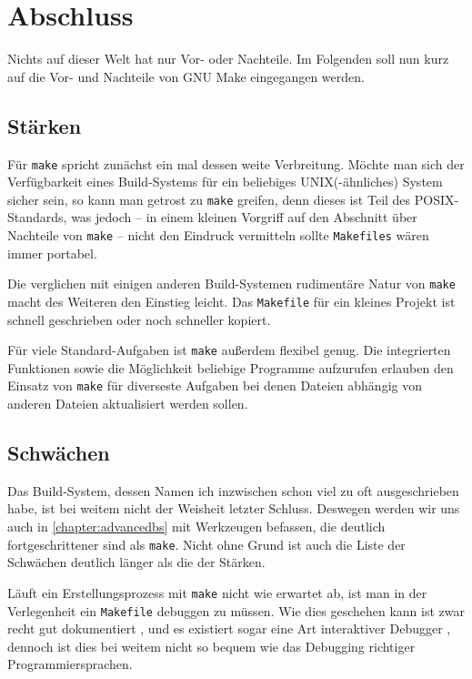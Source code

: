\section{Abschluss}

Nichts auf dieser Welt hat nur Vor- oder Nachteile. Im Folgenden soll nun kurz
auf die Vor- und Nachteile von GNU Make eingegangen werden.

\subsection{Stärken}

Für \texttt{make} spricht zunächst ein mal dessen weite Verbreitung. Möchte man
sich der Verfügbarkeit eines Build-Systems für ein beliebiges UNIX(-ähnliches)
System sicher sein, so kann man getrost zu \texttt{make} greifen, denn dieses
ist Teil des POSIX-Standards, was jedoch -- in einem kleinen Vorgriff auf den
Abschnitt über Nachteile von \texttt{make} -- nicht den Eindruck vermitteln
sollte \texttt{Makefiles} wären immer portabel.

Die verglichen mit einigen anderen Build-Systemen rudimentäre Natur von
\texttt{make} macht des Weiteren den Einstieg leicht. Das \texttt{Makefile} für
ein kleines Projekt ist schnell geschrieben oder noch schneller kopiert.

Für viele Standard-Aufgaben ist \texttt{make} außerdem flexibel genug. Die
integrierten Funktionen sowie die Möglichkeit beliebige Programme aufzurufen
erlauben den Einsatz von \texttt{make} für diverseste Aufgaben bei denen Dateien
abhängig von anderen Dateien aktualisiert werden sollen.

\subsection{Schwächen} 

Das Build-System, dessen Namen ich inzwischen schon viel zu oft ausgeschrieben
habe, ist bei weitem nicht der Weisheit letzter Schluss. Deswegen werden wir
uns auch in \autoref{chapter:advancedbs} mit Werkzeugen befassen, die
deutlich fortgeschrittener sind als \texttt{make}. Nicht ohne Grund ist auch die
Liste der Schwächen deutlich länger als die der Stärken.

Läuft ein Erstellungsprozess mit \texttt{make} nicht wie erwartet ab, ist man in
der Verlegenheit ein \texttt{Makefile} debuggen zu müssen. Wie dies geschehen
kann ist zwar recht gut dokumentiert ,
und es existiert sogar eine Art interaktiver Debugger ,
dennoch ist dies bei weitem nicht so bequem wie das Debugging richtiger
Programmiersprachen.

